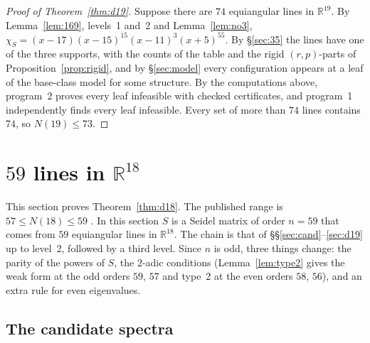 \documentclass[11pt]{article}
\theoremstyle{definition}
\newcommand{\R}{\mathbb{R}}
\begin{document}
\begin{proof}[Proof of Theorem~\ref{thm:d19}]
Suppose there are $74$ equiangular lines in $\R^{19}$. By Lemma~\ref{lem:169}, levels~1 and~2 and
Lemma~\ref{lem:no3}, $\chi_S=(x-17)(x-15)^{15}(x-11)^3(x+5)^{55}$. By \S\ref{sec:35} the lines have one of
the three supports, with the counts of the table and the rigid $(r,p)$-parts of
Proposition~\ref{prop:rigid}, and by \S\ref{sec:model} every configuration appears at a leaf of the
base-class model for some structure. By the computations above, program~2 proves every leaf infeasible
with checked certificates, and program~1 independently finds every leaf infeasible. Every set of more
than $74$ lines contains $74$, so $N(19)\le73$.
\end{proof}


\section{\texorpdfstring{$59$ lines in $\R^{18}$}{59 lines in R\textasciicircum 18}}\label{sec:59}

This section proves Theorem~\ref{thm:d18}. The published range is $57\le N(18)\le59$
\cite{GSY23,GS24}. In this section $S$ is a Seidel matrix
of order $n=59$ that comes from $59$ equiangular lines in $\R^{18}$. The chain is that of
\S\S\ref{sec:cand}--\ref{sec:d19} up to level~2, followed by a third level. Since $n$ is odd, three
things change: the parity of the powers of $S$, the $2$-adic conditions (Lemma~\ref{lem:type2} gives
the weak form at the odd orders $59$, $57$ and type~2 at the even orders $58$, $56$), and an extra rule
for even eigenvalues.

\subsection{The candidate spectra}
\end{document}
